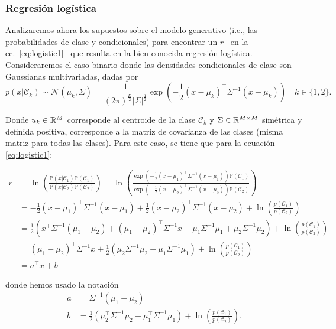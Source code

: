 \subsubsection{Regresión logística} 
\label{sub:reg_log}

Analizaremos ahora  los supuestos sobre el modelo generativo (i.e., las  probabilidades de clase y condicionales) para encontrar un $r$ --en la ec.~\eqref{eq:logistic1}-- que resulta en la bien conocida regresión logística. Consideraremos el caso binario donde las densidades condicionales de clase son Gaussianas multivariadas, dadas por
\begin{equation}
	p(x|\mathcal{C}_k) \sim \mathcal{N} (\mu_k,\Sigma) = \frac{1}{(2\pi)^\frac{D}{2}|\Sigma|^\frac{1}{2}}\exp(-\frac{1}{2}(x-\mu_k)^\top \Sigma^{-1}(x-\mu_k))\quad k\in\{1,2\}.
\end{equation}

Donde $u_k\in\mathbb{R}^M$ corresponde al centroide de la clase $\mathcal{C}_k$ y $\Sigma\in\mathbb{R}^{M\times M}$ simétrica y definida positiva, corresponde a la matriz de covarianza de las clases (misma matriz para todas las clases). Para este caso, se tiene que para la ecuación \eqref{eq:logistic1}:

\begin{align}
r &= \ln\left(\frac{\mathbb{P}(x|\mathcal{C}_1)\mathbb{P}(\mathcal{C}_1)}{\mathbb{P}(x|\mathcal{C}_2)\mathbb{P}(\mathcal{C}_2)}\right) = \ln\left(\frac{\exp(-\frac{1}{2}(x-\mu_1)^\top \Sigma^{-1}(x-\mu_1))\mathbb{P}(\mathcal{C}_1)}{\exp(-\frac{1}{2}(x-\mu_2)^\top \Sigma^{-1}(x-\mu_2))\mathbb{P}(\mathcal{C}_2)}\right)\\
&= -\frac{1}{2}(x-\mu_1)^\top \Sigma^{-1}(x-\mu_1) +\frac{1}{2}(x-\mu_2)^\top \Sigma^{-1}(x-\mu_2) + \ln\left(\frac{p(\mathcal{C}_1)}{p(\mathcal{C}_2)}\right)\\
&= \frac{1}{2}\left(x^\top\Sigma^{-1}(\mu_1-\mu_2) + (\mu_1-\mu_2)^\top\Sigma^{-1}x - \mu_1\Sigma^{-1}\mu_1 + \mu_2\Sigma^{-1}\mu_2 \right) + \ln\left(\frac{p(\mathcal{C}_1)}{p(\mathcal{C}_2)}\right)\\
&= (\mu_1-\mu_2)^\top\Sigma^{-1}x + \frac{1}{2}\left(\mu_2\Sigma^{-1}\mu_2 - \mu_1\Sigma^{-1}\mu_1 \right)+ \ln\left(\frac{p(\mathcal{C}_1)}{p(\mathcal{C}_2)}\right)\\
&= a^\top x+b
\end{align}

donde hemos usado la notación
\begin{align}
a &= \Sigma^{-1}(\mu_1-\mu_2)\\
b &= \frac{1}{2}(\mu_2^\top \Sigma^{-1}\mu_2-\mu_1^\top \Sigma^{-1}\mu_1)
+\ln\left(\frac{p(\mathcal{C}_1)}{p(\mathcal{C}_2)}\right). 
\end{align}


